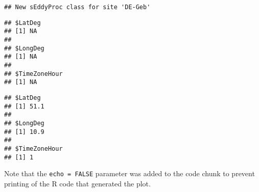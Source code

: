 \documentclass[
]{article}
\newenvironment{Shaded}{\begin{snugshade}}{\end{snugshade}}
\newcommand{\AttributeTok}[1]{\textcolor[rgb]{0.13,0.29,0.53}{#1}}
\newcommand{\CommentTok}[1]{\textcolor[rgb]{0.56,0.35,0.01}{\textit{#1}}}
\newcommand{\DecValTok}[1]{\textcolor[rgb]{0.00,0.00,0.81}{#1}}
\newcommand{\DocumentationTok}[1]{\textcolor[rgb]{0.56,0.35,0.01}{\textbf{\textit{#1}}}}
\newcommand{\FloatTok}[1]{\textcolor[rgb]{0.00,0.00,0.81}{#1}}
\newcommand{\FunctionTok}[1]{\textcolor[rgb]{0.13,0.29,0.53}{\textbf{#1}}}
\newcommand{\NormalTok}[1]{#1}
\newcommand{\OtherTok}[1]{\textcolor[rgb]{0.56,0.35,0.01}{#1}}
\newcommand{\SpecialCharTok}[1]{\textcolor[rgb]{0.81,0.36,0.00}{\textbf{#1}}}
\newcommand{\StringTok}[1]{\textcolor[rgb]{0.31,0.60,0.02}{#1}}
\begin{document}
\begin{Shaded}
\end{Shaded}

\begin{verbatim}
## New sEddyProc class for site 'DE-Geb'
\end{verbatim}

\begin{Shaded}
\end{Shaded}

\begin{verbatim}
## $LatDeg
## [1] NA
## 
## $LongDeg
## [1] NA
## 
## $TimeZoneHour
## [1] NA
\end{verbatim}

\begin{Shaded}
\end{Shaded}

\begin{verbatim}
## $LatDeg
## [1] 51.1
## 
## $LongDeg
## [1] 10.9
## 
## $TimeZoneHour
## [1] 1
\end{verbatim}

Note that the \texttt{echo\ =\ FALSE} parameter was added to the code
chunk to prevent printing of the R code that generated the plot.
\end{document}
